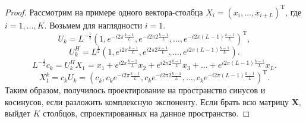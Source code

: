 \documentclass[a4paper, 11pt]{article}
\newtheorem{comment}{Замечание} %
\begin{document}

\begin{proof}
	Рассмотрим на примере одного вектора-столбца $X_i = \left(x_i, \dots, x_{i+L}\right)^{\mathrm T}$, где $i = 1, \dots, K$. Возьмем для наглядности $i = 1$.
	$$
		U_k = L^{-\frac{1}{2}}\left(1, e^{-i2\pi \frac{k-1}{L}}, e^{-i2\pi 2\frac{k-1}{L}}, \dots, e^{-i2\pi (L-1)\frac{k-1}{L}}\right)^{\mathrm T},
	$$
	$$
		U_k^H = L^{\frac{1}{2}}\left(1, e^{i2\pi \frac{k-1}{L}}, e^{i2\pi 2\frac{k-1}{L}}, \dots, e^{i2\pi (L-1)\frac{k-1}{L}}\right).
	$$
	$$
		L^{-\frac{1}{2}}c_k = U_k^H X_1 = x_1 + e^{i2\pi \frac{k-1}{L}} x_2 + e^{i2\pi 2\frac{k-1}{L}} x_3 + \dots + e^{i2\pi (L-1)\frac{k-1}{L}} x_L.
	$$
	$$
		X_1^k = c_k U_k = \left(c_k, c_k e^{-i2\pi \frac{k-1}{L}}, c_k e^{-i2\pi 2\frac{k-1}{L}}, \dots, c_k e^{-i2\pi (L-1)\frac{k-1}{L}}\right)^{\mathrm T}.
	$$
	Таким образом, получилось проектирование на пространство синусов и косинусов, если разложить комплексную экспоненту.
	Если брать всю матрицу $\mathbf X$, выйдет $K$ столбцов, спроектированных на данное пространство.
\end{proof}

\end{document}
